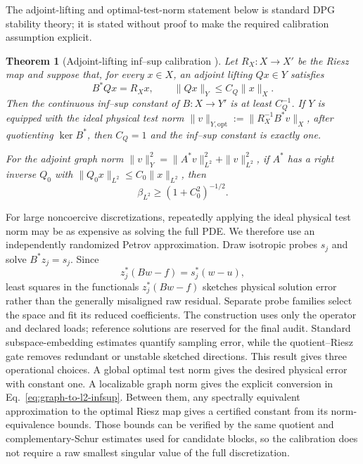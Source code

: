 \documentclass[11pt]{article}
\newtheorem{theorem}{Theorem}[section]
\numberwithin{algorithm}{section}
\theoremstyle{definition}\newtheorem{definition}[theorem]{Definition}
\theoremstyle{remark}\newtheorem{remark}[theorem]{Remark}
\begin{document}
The adjoint-lifting and optimal-test-norm statement below is standard DPG
stability theory; it is stated without proof to make the required calibration
assumption explicit.
\begin{theorem}[Adjoint-lifting inf--sup calibration
  {\cite{demkowiczgopalakrishnan2011}}]
\label{thm:adjoint-lifting-infsup}
Let $R_X:X\to X'$ be the Riesz map and suppose that, for every $x\in X$, an
adjoint lifting $Qx\in Y$ satisfies
\begin{equation}
 B^*Qx=R_Xx,
 \qquad \|Qx\|_Y\leq C_Q\|x\|_X.
 \label{eq:adjoint-lifting}
\end{equation}
Then the continuous inf--sup constant of $B:X\to Y'$ is at least $C_Q^{-1}$.
If $Y$ is equipped with the ideal physical test norm
$\|v\|_{Y,\mathrm{opt}}:=\|R_X^{-1}B^*v\|_X$, after quotienting
$\ker B^*$, then $C_Q=1$ and the inf--sup constant is exactly one.

For the adjoint graph norm
$\|v\|_Y^2=\|A^*v\|_{L^2}^2+\|v\|_{L^2}^2$, if $A^*$ has a right inverse
$Q_0$ with $\|Q_0x\|_{L^2}\leq C_0\|x\|_{L^2}$, then
\begin{equation}
 \beta_{L^2}\geq(1+C_0^2)^{-1/2}.
 \label{eq:graph-to-l2-infsup}
\end{equation}
\end{theorem}
For large noncoercive discretizations, repeatedly applying the ideal physical
test norm may be as expensive as solving the full PDE.  We therefore use an
independently randomized Petrov approximation.  Draw isotropic probes $s_j$
and solve $B^*z_j=s_j$.  Since
\begin{equation}
 z_j^*(Bw-f)=s_j^*(w-u),
 \label{eq:adjoint-petrov-sketch}
\end{equation}
least squares in the functionals $z_j^*(Bw-f)$ sketches physical solution
error rather than the generally misaligned raw residual.  Separate probe
families select the space and fit its reduced coefficients.  The construction
uses only the operator and declared loads; reference solutions are reserved
for the final audit.  Standard subspace-embedding estimates quantify sampling
error, while the quotient--Riesz gate removes redundant or unstable sketched
directions.
This result gives three operational choices.  A global optimal test norm
gives the desired physical error with constant one.  A localizable graph norm
gives the explicit conversion in Eq.~\eqref{eq:graph-to-l2-infsup}.  Between
them, any spectrally equivalent approximation to the optimal Riesz map gives
a certified constant from its norm-equivalence bounds.  Those bounds can be
verified by the same quotient and complementary-Schur estimates used for
candidate blocks, so the calibration does not require a raw smallest
singular value of the full discretization.
\end{document}

